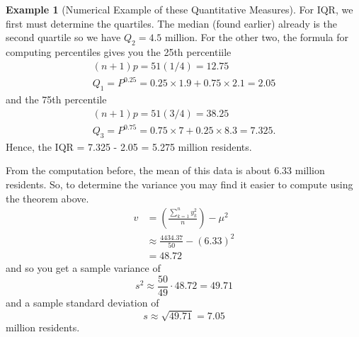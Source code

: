 \documentclass[10pt,]{book}
\theoremstyle{plain}
\theoremstyle{definition}
\theoremstyle{definition}
\newtheorem{example}[theorem]{Example}
\theoremstyle{definition}
\numberwithin{equation}{section}
\begin{document}
\begin{example}[Numerical Example of these Quantitative Measures]
For IQR, we first must determine the quartiles. The median (found earlier) already is the second quartile so we have \(Q_2 = 4.5\) million. For the other two, the formula for computing percentiles gives you the 25th percentiile
\begin{gather*}
(n+1)p = 51(1/4) = 12.75\\
Q_1 = P^{0.25} = 0.25 \times 1.9 + 0.75 \times 2.1 = 2.05
\end{gather*}
and the 75th percentile
\begin{gather*}
(n+1)p = 51(3/4) = 38.25\\
Q_3 = P^{0.75} = 0.75 \times 7 + 0.25 \times 8.3 = 7.325.
\end{gather*}
Hence, the IQR = 7.325 - 2.05 = 5.275 million residents.
%
\par

From the computation before, the mean of this data is about 6.33
million residents. So, to determine the variance you may find it easier to compute using the theorem above. 
\begin{align*}
 v & = \left ( \frac{\sum_{k=1}^n y_k^2 }{n} \right ) - \mu^2
\\
 & \approx \frac{4434.37}{50} - (6.33)^2
\\
 & = 48.72

\end{align*}
and so you get a sample variance of
\begin{equation*} s^2 \approx \frac{50}{49} \cdot 48.72 = 49.71\end{equation*}
and a sample standard deviation of
\begin{equation*}s \approx \sqrt{49.71} = 7.05\end{equation*} million residents.
%
\end{example}
\typeout{************************************************}
\typeout{************************************************}
\end{document}

